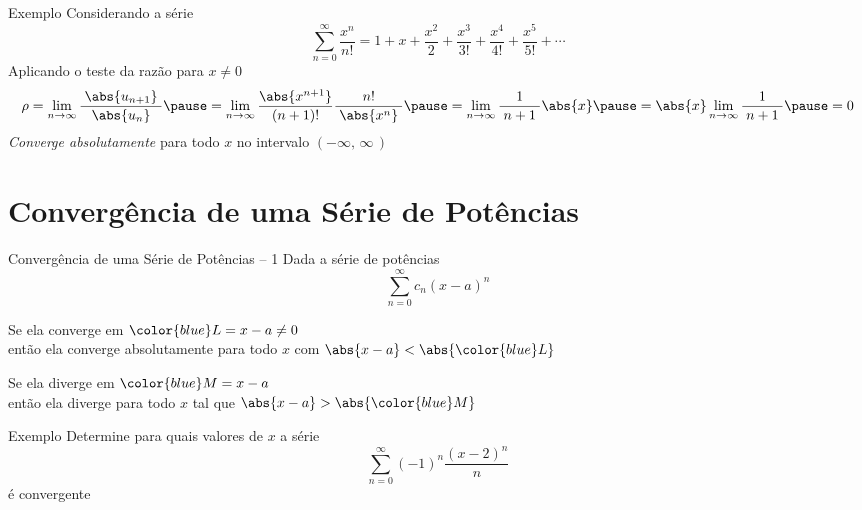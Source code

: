 \addtocounter{exemplo}{1}
\begin{frame}{Exemplo \theexemplo}
  Considerando a série
  \[
    \sum_{n=0}^{\infty} \frac{x^n}{n!}
    = 1 + x
        + \frac{x^2}{2}
        + \frac{x^3}{3!}
        + \frac{x^4}{4!}
        + \frac{x^5}{5!}
        + \cdots
  \]
  \pause
  Aplicando o teste da razão para $x\neq 0$
  \[
    \rho   = \lim_{n\to\infty} \frac{\;\abs{u_{n+1}}\;}{\abs{u_n}}
    \pause = \lim_{n\to\infty} \frac{\abs{x^{n+1}}}{\;(n+1)!\;} \frac{n!}{\;\abs{x^n}\;}
    \pause = \lim_{n\to\infty} \frac{1}{\;n+1\;} \abs{x}
    \pause = \abs{x} \lim_{n\to\infty} \frac{1}{\;n+1\;}
    \pause = 0
  \]
  \pause
  \emph{Converge absolutamente} para todo $x$ no intervalo $(-\infty,\,\infty\,)$
\end{frame}

\section{Convergência de uma Série de Potências}

\begin{frame}{Convergência de uma Série de Potências -- 1}
  Dada a série de potências
  \[
    \sum_{n=0}^\infty c_n(x-a)^n
  \]

  \pause
  \vspace{\baselineskip}
  Se ela converge em \({\color{blue}L}=x-a\neq 0\) \\[1mm] \pause
  então ela converge absolutamente para todo $x$ com
  \(
    \abs{x-a} < \abs{{\color{blue}L}}
  \)

  \pause
  \vspace{\baselineskip}
  Se ela diverge em \({\color{blue}M}=x-a\) \\[1mm] \pause
  então ela diverge para todo $x$ tal que
  \(
    \abs{x-a}>\abs{{\color{blue}M}}
  \)

\end{frame}

\addtocounter{exemplo}{1}
\begin{frame}{Exemplo \theexemplo}
  Determine para quais valores de $x$ a série
  \[
    \sum_{n=0}^\infty (-1)^n\frac{(x-2)^n}{n}
  \]
  é convergente
\end{frame}

